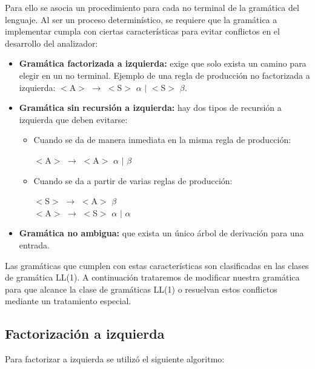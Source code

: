 Para ello se asocia un procedimiento para cada no terminal de la gramática del lenguaje. Al ser un proceso determinístico, se requiere que la gramática a implementar cumpla con ciertas características para evitar conflictos en el desarrollo del analizador:
\begin{itemize}
\item {\bf Gramática factorizada a izquierda:} exige que solo exista un camino para elegir en un no terminal. Ejemplo de una regla de producción no factorizada a izquierda: $<$A$>$ $\rightarrow$ $<$S$>$ $\alpha$ $|$ $<$S$>$ $\beta$.
\item {\bf Gramática sin recursión a izquierda:} hay dos tipos de recursión a izquierda que deben evitarse: 
\begin{itemize}
\item Cuando se da de manera inmediata en la misma regla de producción: 
\begin{center}
$<$A$>$ $\rightarrow$ $<$A$>$ $\alpha$ $|$ $\beta$
\end{center}
\item Cuando se da a partir de varias reglas de producción:
\begin{center}
$<$S$>$ $\rightarrow$ $<$A$>$ $\beta$\\
$<$A$>$ $\rightarrow$ $<$S$>$ $\alpha$ $|$ $\alpha$
\end{center}
\end{itemize}
\item {\bf Gramática no ambigua:} que exista un único árbol de derivación para una entrada.
\end{itemize}

Las gramáticas que cumplen con estas características son clasificadas en las clases de gramática LL(1). A continuación trataremos de modificar nuestra gramática para que alcance la clase de gramáticas LL(1) o resuelvan estos conflictos mediante un tratamiento especial.

\subsection{Factorización a izquierda}
Para factorizar a izquierda se utilizó el siguiente algoritmo:

\begin{center}
\end{center}

